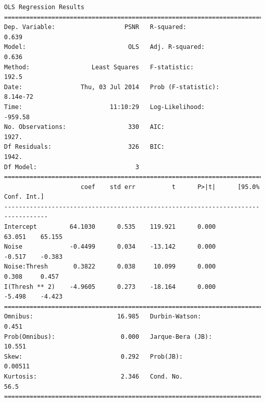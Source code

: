 \documentclass[11pt]{article}
\theoremstyle{definition}
\begin{document}
{\footnotesize
\begin{lstlisting}[caption = Time Series 1 - FFT Coefficient Thresholding OLS Model, label = {fftfilterseries1}]
                            OLS Regression Results                            
==============================================================================
Dep. Variable:                   PSNR   R-squared:                       0.639
Model:                            OLS   Adj. R-squared:                  0.636
Method:                 Least Squares   F-statistic:                     192.5
Date:                Thu, 03 Jul 2014   Prob (F-statistic):           8.14e-72
Time:                        11:10:29   Log-Likelihood:                -959.58
No. Observations:                 330   AIC:                             1927.
Df Residuals:                     326   BIC:                             1942.
Df Model:                           3                                         
==================================================================================
                     coef    std err          t      P>|t|      [95.0% Conf. Int.]
----------------------------------------------------------------------------------
Intercept         64.1030      0.535    119.921      0.000        63.051    65.155
Noise             -0.4499      0.034    -13.142      0.000        -0.517    -0.383
Noise:Thresh       0.3822      0.038     10.099      0.000         0.308     0.457
I(Thresh ** 2)    -4.9605      0.273    -18.164      0.000        -5.498    -4.423
==============================================================================
Omnibus:                       16.985   Durbin-Watson:                   0.451
Prob(Omnibus):                  0.000   Jarque-Bera (JB):               10.551
Skew:                           0.292   Prob(JB):                      0.00511
Kurtosis:                       2.346   Cond. No.                         56.5
==============================================================================
\end{lstlisting}

}
\end{document}
